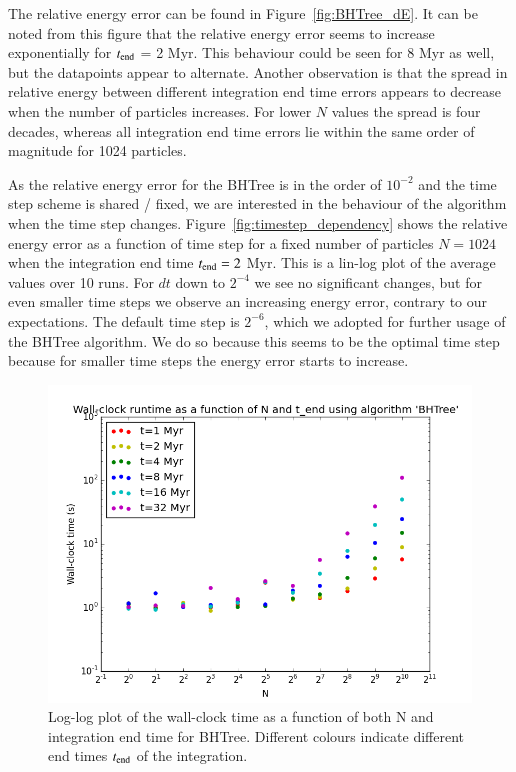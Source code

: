 \documentclass{aa}
\begin{document}
The relative energy error can be found in Figure~\ref{fig:BHTree_dE}. It can be noted from this figure that the relative energy error seems to increase exponentially for $t_{\rm end}$ = 2 Myr. This behaviour could be seen for 8 Myr as well, but the datapoints appear to alternate. Another observation is that the spread in relative energy between different integration end time errors appears to decrease when the number of particles increases. For lower $N$ values the spread is four decades, whereas all integration end time errors lie within the same order of magnitude for 1024 particles.

As the relative energy error for the BHTree is in the order of $10^{-2}$ and the time step scheme is shared / fixed, we are interested in the behaviour of the algorithm when the time step changes. Figure~\ref{fig:timestep_dependency} shows the relative energy error as a function of time step for a fixed number of particles $N = 1024$ when the integration end time $t_{\rm end} = 2$ Myr. This is a lin-log plot of the average values over 10 runs. For $dt$ down to $2^{-4}$ we see no significant changes, but for even smaller time steps we observe an increasing energy error, contrary to our expectations. The default time step is $2^{-6}$, which we adopted for further usage of the BHTree algorithm. We do so because this seems to be the optimal time step because for smaller time steps the energy error starts to increase.
  
   \begin{figure}
   \centering
   \includegraphics[width=\hsize]{img/CA_GD_TLRH_s1603221_SS_s1617451_BHTree_runtime_log.png}
      \caption{Log-log plot of the wall-clock time as a function of both N and integration 
               end time for BHTree. Different colours indicate different end times $t_{\rm end}$ of the integration.
              }
         \label{fig:BHTree_runtime}
   \end{figure}
   
\end{document}
